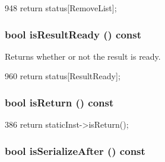 \begin{DoxyCode}
948 { return status[RemoveList]; }
\end{DoxyCode}
\hypertarget{classInOrderDynInst_aa494f3355348eb3a97ce809b6361e195}{
\subsubsection[{isResultReady}]{\setlength{\rightskip}{0pt plus 5cm}bool isResultReady () const}}
\label{classInOrderDynInst_aa494f3355348eb3a97ce809b6361e195}
Returns whether or not the result is ready. 


\begin{DoxyCode}
960 { return status[ResultReady]; }
\end{DoxyCode}
\hypertarget{classInOrderDynInst_a56f87bc75115f1dcea77803b01f40d2c}{
\subsubsection[{isReturn}]{\setlength{\rightskip}{0pt plus 5cm}bool isReturn () const}}
\label{classInOrderDynInst_a56f87bc75115f1dcea77803b01f40d2c}



\begin{DoxyCode}
386 { return staticInst->isReturn(); }
\end{DoxyCode}
\hypertarget{classInOrderDynInst_a4d1c24871e03e495a1841ea16d11a68f}{
\subsubsection[{isSerializeAfter}]{\setlength{\rightskip}{0pt plus 5cm}bool isSerializeAfter () const}}
\label{classInOrderDynInst_a4d1c24871e03e495a1841ea16d11a68f}



